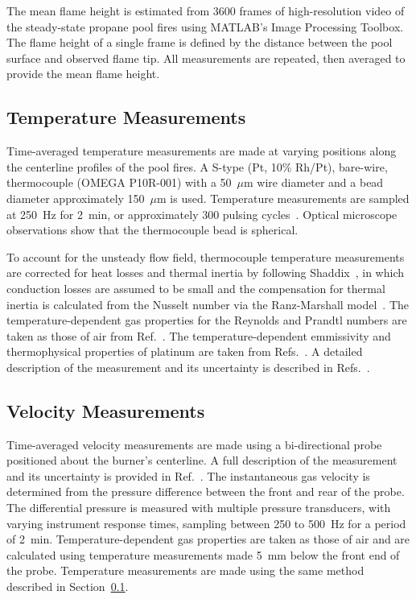 \documentclass[12pt]{ussci}
\begin{document}
The mean flame height is estimated from 3600 frames of high-resolution video of the steady-state propane pool fires using MATLAB's Image Processing Toolbox. The flame height of a single frame is defined by the distance between the pool surface and observed flame tip. All measurements are repeated, then averaged to provide the mean flame height. 

\subsection{Temperature Measurements}\label{ssec:Temp_Meas}
Time-averaged temperature measurements are made at varying positions along the centerline profiles of the pool fires. A S-type (Pt, 10\% Rh/Pt), bare-wire, thermocouple (OMEGA P10R-001) with a 50~$\mu$m wire diameter and a bead diameter approximately 150~$\mu$m is used. Temperature measurements are sampled at 250~Hz for 2~min, or approximately 300 pulsing cycles~\cite{}. Optical microscope observations show that the thermocouple bead is spherical. 

To account for the unsteady flow field, thermocouple temperature measurements are corrected for heat losses and thermal inertia by following Shaddix~\cite{Shaddix2001}, in which conduction losses are assumed to be small and the compensation for thermal inertia is calculated from the Nusselt number via the Ranz-Marshall model~\cite{Shaddix1999}. The temperature-dependent gas properties for the Reynolds and Prandtl numbers are taken as those of air from Ref.~\cite{Incropera2007}.  The temperature-dependent emmissivity and thermophysical properties of platinum are taken from Refs.~\cite{Platinum2010, Jaeger1939}. A detailed description of the measurement and its uncertainty is described in Refs.~\cite{Sung2019}. 

\subsection{Velocity Measurements}
Time-averaged velocity measurements are made using a bi-directional probe positioned about the burner's centerline. A full description of the measurement and its uncertainty is provided in Ref.~\cite{Sung2021}. The instantaneous gas velocity is determined from the pressure difference between the front and rear of the probe. The differential pressure is measured with multiple pressure transducers, with varying instrument response times, sampling between 250 to 500~Hz for a period of 2~min. Temperature-dependent gas properties are taken as those of air and are calculated using temperature measurements made 5~mm below the front end of the probe. Temperature measurements are made using the same method described in Section~\ref{ssec:Temp_Meas}. 
\end{document}
